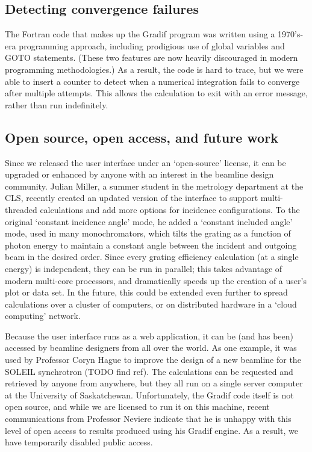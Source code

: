 \subsection{Detecting convergence failures}
The Fortran code that makes up the Gradif program was written using a 1970's-era programming approach, including prodigious use of global variables and GOTO statements.  (These two features are now heavily discouraged in modern programming methodologies.)  As a result, the code is hard to trace, but we were able to insert a counter to detect when a numerical integration fails to converge after multiple attempts.  This allows the calculation to exit with an error message, rather than run indefinitely.

\subsection{Open source, open access, and future work}
Since we released the user interface under an `open-source' license, it can be upgraded or enhanced by anyone with an interest in the beamline design community.  Julian Miller, a summer student in the metrology department at the CLS, recently created an updated version of the interface to support multi-threaded calculations and add more options for incidence configurations.  To the original `constant incidence angle' mode, he added a `constant included angle' mode, used in many monochromators, which tilts the grating as a function of photon energy to maintain a constant angle between the incident and outgoing beam in the desired order.  Since every grating efficiency calculation (at a single energy) is independent, they can be run in parallel; this takes advantage of modern multi-core processors, and dramatically speeds up the creation of a user's plot or data set.  In the future, this could be extended even further to spread calculations over a cluster of computers, or on distributed hardware in a `cloud computing' network.

Because the user interface runs as a web application, it can be (and has been) accessed by beamline designers from all over the world.  As one example, it was used by Professor Coryn Hague to improve the design of a new beamline for the SOLEIL synchrotron (TODO find ref).  The calculations can be requested and retrieved by anyone from anywhere, but they all run on a single server computer at the University of Saskatchewan.  Unfortunately, the Gradif code itself is not open source, and while we are licensed to run it on this machine, recent communications from Professor Neviere indicate that he is unhappy with this level of open access to results produced using his Gradif engine.  As a result, we have temporarily disabled public access.

